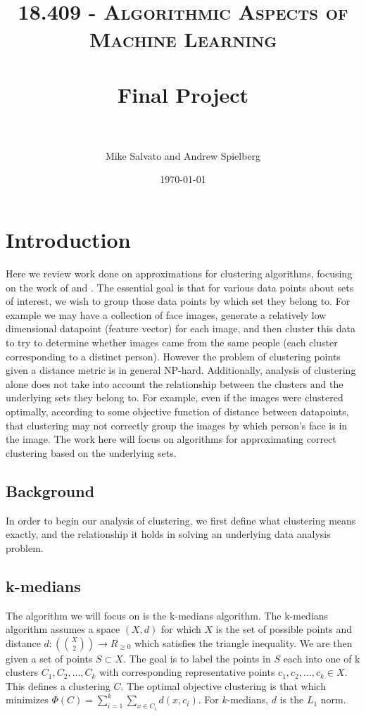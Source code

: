 \documentclass[paper=a4, fontsize=10.5pt]{scrartcl} %
\title{	
\normalfont \normalsize 
\textsc{18.409 - Algorithmic Aspects of Machine Learning} \\ [25pt] %
\horrule{0.5pt} \\[0.4cm] %
\huge Final Project \\ %
\horrule{2pt} \\[0.5cm] %
}
\author{Mike Salvato and Andrew Spielberg} %
\date{\normalsize\today} %
\numberwithin{equation}{section} %
\numberwithin{figure}{section} %
\numberwithin{table}{section} %
\begin{document}
\maketitle %

\section{Introduction}

Here we review work done on approximations for clustering algorithms, focusing on the work of \cite{firstpaper} and \cite{secondpaper}. The essential goal is that for various data points about sets of interest, we wish to group those data points by which set they belong to. For example we may have a collection of face images, generate a relatively low dimensional datapoint (feature vector) for each image, and then cluster this data to try to determine whether images came from the same people (each cluster corresponding to a distinct person). However the problem of clustering points given a distance metric is in general NP-hard. Additionally, analysis of clustering alone does not take into account the relationship between the clusters and the underlying sets they belong to. For example, even if the images were clustered optimally, according to some objective function of distance between datapoints, that clustering may not correctly group the images by which person's face is in the image. The work here will focus on algorithms for approximating correct clustering based on the underlying sets.

\subsection{Background}

In order to begin our analysis of clustering, we first define what clustering means exactly, and the relationship it holds in solving an underlying data analysis problem. 

\subsection{k-medians}
The algorithm we will focus on is the k-medians algorithm. The k-medians algorithm assumes a space $(X, d)$ for which $X$ is the set of possible points and distance $d : ({ X \choose 2}) \rightarrow R_{\geq 0}$ which satisfies the triangle inequality. We are then given a set of points $S \subset X$. The goal is to label the points in $S$ each into one of k clusters $C_1, C_2, ..., C_k$ with corresponding representative points $c_1, c_2, ..., c_k \in X$. This defines a clustering $C$. The optimal objective clustering is that which minimizes $\Phi(C) = \sum\limits_{i = 1}^k \sum_{x \in C_i} d(x, c_i)$.  For $k$-medians, $d$ is the $L_1$ norm.
\end{document}
